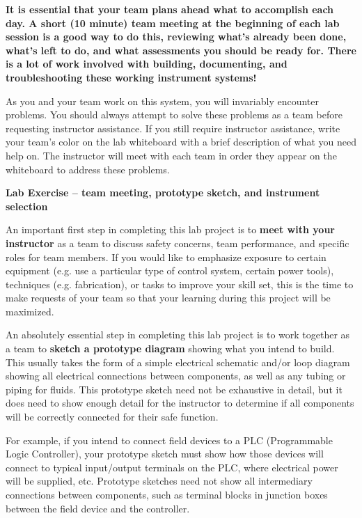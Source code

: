 \vskip 10pt

{\bf It is essential that your team plans ahead what to accomplish each day.  A short (10 minute) team meeting at the beginning of each lab session is a good way to do this, reviewing what's already been done, what's left to do, and what assessments you should be ready for.  There is a lot of work involved with building, documenting, and troubleshooting these working instrument systems!}

As you and your team work on this system, you will invariably encounter problems.  You should always attempt to solve these problems as a team before requesting instructor assistance.  If you still require instructor assistance, write your team's color on the lab whiteboard with a brief description of what you need help on.  The instructor will meet with each team in order they appear on the whiteboard to address these problems.





\vfil \eject

\noindent
{\bf Lab Exercise -- team meeting, prototype sketch, and instrument selection}

\vskip 5pt

An important first step in completing this lab project is to {\bf meet with your instructor} as a team to discuss safety concerns, team performance, and specific roles for team members.  If you would like to emphasize exposure to certain equipment (e.g. use a particular type of control system, certain power tools), techniques (e.g. fabrication), or tasks to improve your skill set, this is the time to make requests of your team so that your learning during this project will be maximized.

\vskip 10pt

An absolutely essential step in completing this lab project is to work together as a team to {\bf sketch a prototype diagram} showing what you intend to build.  This usually takes the form of a simple electrical schematic and/or loop diagram showing all electrical connections between components, as well as any tubing or piping for fluids.  This prototype sketch need not be exhaustive in detail, but it does need to show enough detail for the instructor to determine if all components will be correctly connected for their safe function.

For example, if you intend to connect field devices to a PLC (Programmable Logic Controller), your prototype sketch must show how those devices will connect to typical input/output terminals on the PLC, where electrical power will be supplied, etc.  Prototype sketches need not show all intermediary connections between components, such as terminal blocks in junction boxes between the field device and the controller.

